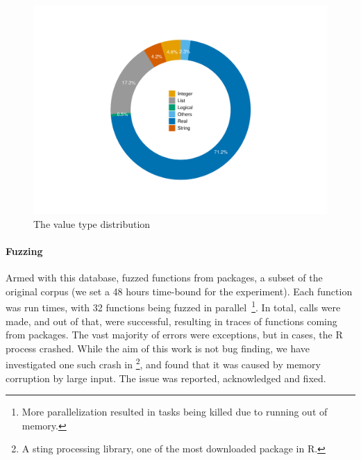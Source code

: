 \documentclass[sigplan,anonymous,review]{acmart}
\begin{document}
\begin{figure}
    \centering
    \includegraphics[width=\columnwidth]{code-and-figures/argsdb-value-distribution.pdf}
    \caption{The \sxpdb value type distribution}
    \label{fig:argsdb-value-distribution}
\end{figure}

\paragraph{Fuzzing}

Armed with this database, \tool fuzzed \UFNumFunctions functions from \UFNumPackages packages, a subset of the original corpus (we set a 48 hours time-bound for the experiment).
Each function was run \UFTracingBudget times, with 32 functions being fuzzed in parallel~\footnote{More parallelization resulted in tasks being killed due to running out of memory.}.
In total, \UFNumTracesRnd calls were made, and out of that, \UFRatioSuccessTraces were successful, resulting in \UFNumSuccessTraces traces of \UFNumSuccessFunctions functions coming from \UFNumSuccessPackages packages.
The vast majority of errors were exceptions, but in \UFNumOfCrashedRSessions cases, the R process crashed.
While the aim of this work is not bug finding, we have investigated one such crash in \footnote{A sting processing library, one of the most downloaded package in R.}, and found that it was caused by memory corruption by large input.
The issue was reported, acknowledged and fixed.
\end{document}
